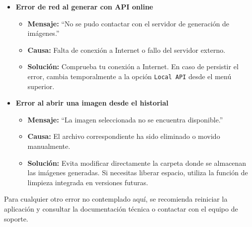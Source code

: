 \begin{itemize}
\item \textbf{Error de red al generar con API online}  
\begin{itemize}
    \item \textbf{Mensaje:} ``No se pudo contactar con el servidor de generación de imágenes.''
    \item \textbf{Causa:} Falta de conexión a Internet o fallo del servidor externo.
    \item \textbf{Solución:} Comprueba tu conexión a Internet. En caso de persistir el error, cambia temporalmente a la opción \texttt{Local API} desde el menú superior.
\end{itemize}

\item \textbf{Error al abrir una imagen desde el historial}  
\begin{itemize}
    \item \textbf{Mensaje:} ``La imagen seleccionada no se encuentra disponible.''
    \item \textbf{Causa:} El archivo correspondiente ha sido eliminado o movido manualmente.
    \item \textbf{Solución:} Evita modificar directamente la carpeta donde se almacenan las imágenes generadas. Si necesitas liberar espacio, utiliza la función de limpieza integrada en versiones futuras.
\end{itemize}
\end{itemize}

\vspace{1em}
Para cualquier otro error no contemplado aquí, se recomienda reiniciar la aplicación y consultar la documentación técnica o contactar con el equipo de soporte.